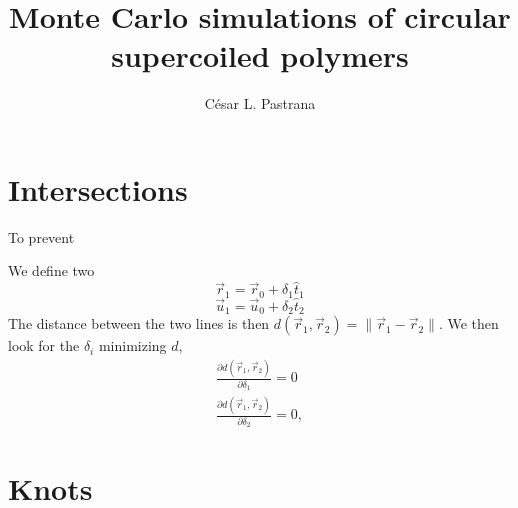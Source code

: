 \documentclass[a4paper, 11pt]{article}
\title{\textbf{Monte Carlo simulations of circular supercoiled polymers}}
\author{César L. Pastrana}
\date{}
\newcommand\norm[1]{\lVert#1\rVert}
\begin{document}
\maketitle

\section{Intersections}
To prevent 

We define two
\begin{equation}
 \vec{r}_1 = \vec{r}_0 + \delta_1\hat{t}_1
\end{equation}
\begin{equation}
 \vec{u}_1 = \vec{u}_0 + \delta_2\hat{t}_2
\end{equation}
The distance between the two lines is then $d(\vec{r}_1, \vec{r}_2) = \norm{\vec{r}_1 - \vec{r}_2}$. We then look for the $\delta_i$ minimizing $d$,
\begin{equation}
\begin{split}
 \frac{\partial d(\vec{r}_1, \vec{r}_2)}{\partial \delta_1} = 0\\
 \frac{\partial d(\vec{r}_1, \vec{r}_2)}{\partial \delta_2} = 0,
 \end{split}
\end{equation}

\section{Knots}
\end{document}
